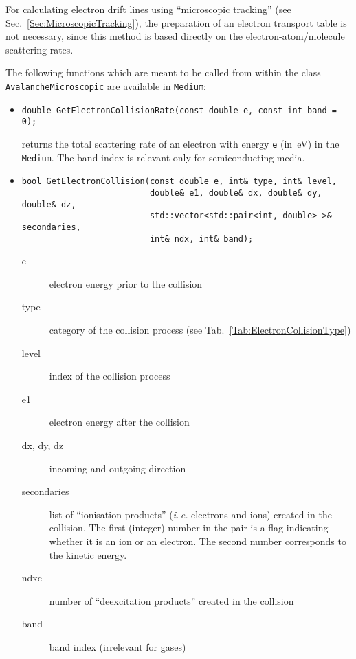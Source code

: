 For calculating electron drift lines using ``microscopic tracking'' 
(see Sec.~\ref{Sec:MicroscopicTracking}),
the preparation of an electron transport table is not necessary, 
since this method is based directly on the electron-atom/molecule 
scattering rates. 

The following functions which are meant to be called from within the 
class \texttt{AvalancheMicroscopic} are available in \texttt{Medium}:
\begin{itemize}
  \item
\begin{lstlisting}
double GetElectronCollisionRate(const double e, const int band = 0);
\end{lstlisting}
returns the total scattering rate of an electron with energy \texttt{e} 
(in~eV) in the \texttt{Medium}. The band index is relevant only 
for semiconducting media.
  \item
\begin{lstlisting}
bool GetElectronCollision(const double e, int& type, int& level,
                          double& e1, double& dx, double& dy, double& dz,
                          std::vector<std::pair<int, double> >& secondaries,
                          int& ndx, int& band);
\end{lstlisting}
\begin{description}
  \item[e]          electron energy prior to the collision
  \item[type]       category of the collision process
                    (see Tab.~\ref{Tab:ElectronCollisionType})
  \item[level]      index of the collision process
  \item[e1]         electron energy after the collision
  \item[dx, dy, dz] incoming and outgoing direction
  \item[secondaries] list of ``ionisation products'' 
                    (\textit{i.\,e.} electrons and ions) 
                    created in the collision. 
                    The first (integer) number in the pair is a flag indicating whether 
                    it is an ion or an electron. The second number corresponds to the kinetic energy. 
  \item[ndxc]       number of ``deexcitation products'' 
                    created in the collision
  \item[band]       band index (irrelevant for gases) 
\end{description}
\end{itemize}


